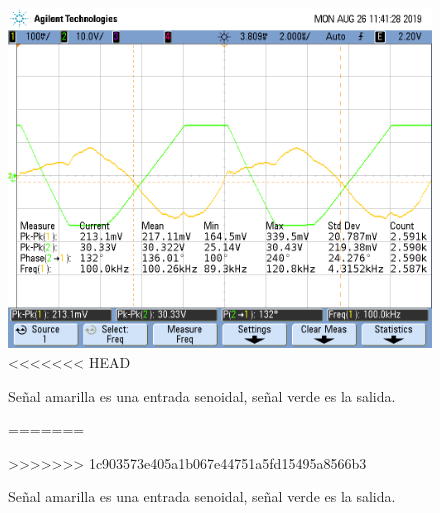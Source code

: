 \begin{figure}[H]
	\centering
	\includegraphics[scale=0.4]{Derivador/Mediciones/Osciloscopio/Justificacion/scope_4.png}
<<<<<<< HEAD
	\caption{Se\~nal amarilla es una entrada senoidal, se\~nal verde es la salida.}
=======
	\caption{Señal amarilla es una entrada senoidal, señal verde es la salida.}
>>>>>>> 1c903573e405a1b067e44751a5fd15495a8566b3
	\label{fig:justificacion_derivador}
\end{figure}

